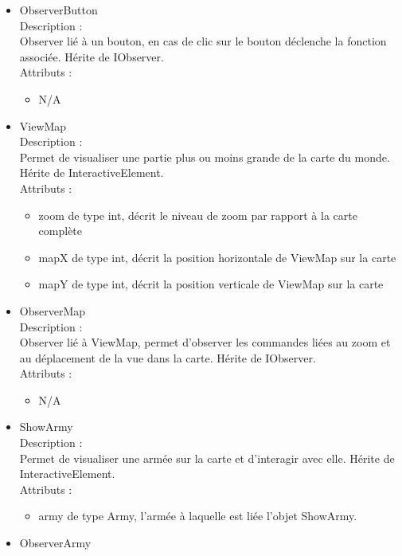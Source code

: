 \documentclass[a4paper,12pt]{article}
\begin{document}
\begin{itemize}
\begin{itemize}
\end{itemize}
\item ObserverButton\\
Description :\\
Observer lié à un bouton, en cas de clic sur le bouton déclenche la fonction associée. Hérite de IObserver.\\
Attributs :
\begin{itemize}
\item N/A\\
\end{itemize}
\item ViewMap\\
Description :\\
Permet de visualiser une partie plus ou moins grande de la carte du monde. Hérite de InteractiveElement.\\
Attributs :
\begin{itemize}
\item zoom de type int, décrit le niveau de zoom par rapport à la carte complète
\item mapX de type int, décrit la position horizontale de ViewMap sur la carte
\item mapY de type int, décrit la position verticale de ViewMap sur la carte\\
\end{itemize}
\item ObserverMap\\
Description :\\
Observer lié à ViewMap, permet d'observer les commandes liées au zoom et au déplacement de la vue dans la carte. Hérite de IObserver.\\
Attributs :
\begin{itemize}
\item N/A\\
\end{itemize}
\item ShowArmy\\
Description :\\
Permet de visualiser une armée sur la carte et d'interagir avec elle. Hérite de InteractiveElement.\\
Attributs :
\begin{itemize}
\item army de type Army, l'armée à laquelle est liée l'objet ShowArmy.\\
\end{itemize}
\item ObserverArmy\\

\end{itemize}
\end{document}
